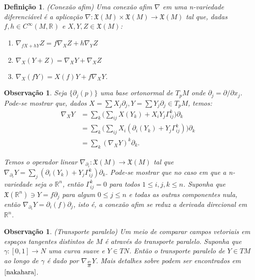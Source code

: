 \documentclass[12pt]{book}
\newtheorem{definicao}[teorema]{Definição}
\newtheorem{observacao}[teorema]{Observação}
\newcommand{\campossuaves}[1]{\mathfrak{X}(#1)}
\newcommand{\funcoessuaves}[1]{C^{\infty}(#1, \real{})}
\newcommand{\real}[1]{\mathbb{R}^{#1}}
\begin{document}
	\begin{definicao}\label{definicao_conexao_afim}
		(Conexão afim) Uma conexão afim $\nabla$ em uma n-variedade diferenciável é a aplicação $\nabla: \campossuaves{M} \times \campossuaves{M} \to \campossuaves{M}$ tal que, dadas $f,h \in \funcoessuaves{M}$ e $X,Y,Z \in \campossuaves{M}$:
		\begin{enumerate}
			\item $\nabla_{fX+hY}Z = f\nabla_{X}Z+h\nabla_{Y}Z$
			\item $\nabla_{X}(Y+Z) = \nabla_{X}Y+ \nabla_{X}Z$
			\item $\nabla_{X}(fY) = X(f)Y+f\nabla_{X}Y$.
		\end{enumerate}
	\end{definicao}
	
	\begin{observacao}\label{observacao_conexao_afim}
		Seja $\{\partial_{j}(p)\}$ uma base ortonormal de $T_{p}M$ onde $\partial_{j} = \partial/\partial x_{j}$. Pode-se mostrar que, dados $X=\sum X_{j}\partial_{j}, Y=\sum Y_{j}\partial_{j} \in T_{p}M$, temos:
		$$
		\begin{aligned}
		\nabla_{X}Y &= 
		\sum_{k} \Big( \sum_{ij} X(Y_{k}) + X_{i}Y_{j} \Gamma^{k}_{ij}\Big)\partial_{k} 
		\\
		&= 
		\sum_{k} \Big( \sum_{ij} X_{i} (\partial_{i}(Y_{k}) + Y_{j} \Gamma^{k}_{ij})\Big)\partial_{k} 
		\\
		&= \sum_{k} (\nabla_{X}Y)^{k}\partial_{k}.
		\end{aligned} 
		$$
		
		Temos o operador linear $\nabla_{\partial_{i}}: \campossuaves{M} \to \campossuaves{M}$ tal que $\nabla_{\partial_{i}}Y = \sum_{j}  (\partial_{i}(Y_{k}) + Y_{j} \Gamma^{k}_{ij})\partial_{k} $. Pode-se mostrar que no caso em que a n-variedade seja o $\real{n}$, então $\Gamma_{ij}^{k}=0$ para todos $1\leq i,j,k \leq n$. Suponha que $\campossuaves{\real{n}} \ni Y = f\partial_{j}$ para algum $0 \leq j \leq n$ e todas as outras componentes nula, então $\nabla_{\partial_{i}}Y = \partial_{i}(f)\partial_{j} $, isto é, a conexão afim se reduz a derivada direcional em $\real{n}$.
	\end{observacao}
	
	\begin{observacao}\label{observacao_transporte_paralelo}
		(Transporte paralelo) Um meio de comparar campos vetoriais em espaços tangentes distintos de $M$ é através do transporte paralelo. Suponha que $\gamma:[0,1] \to N$ uma curva suave e $Y \in TN$. Então o transporte paralelo de $Y \in TM$ ao longo de $\gamma$ é dado por 
		$\nabla_{\frac{d\gamma}{dt}}Y$. Mais detalhes sobre podem ser encontrados em $\cite{nakahara}$.
	\end{observacao}
	
\end{document}
